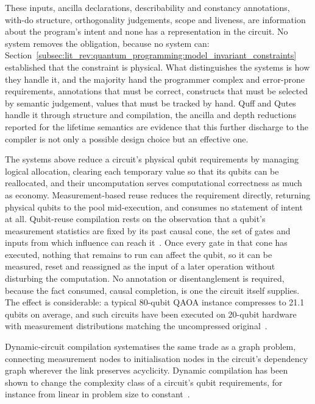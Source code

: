 These inputs, ancilla declarations, describability and constancy annotations, with-do structure, orthogonality judgements, scope and liveness, are information about the program's intent and none has a representation in the circuit.
No system removes the obligation, because no system can: Section~\ref{subsec:lit_rev:quantum_programming:model_invariant_constraints} established that the constraint is physical.
What distinguishes the systems is how they handle it, and the majority hand the programmer complex and error-prone requirements, annotations that must be correct, constructs that must be selected by semantic judgement, values that must be tracked by hand.
Quff and Qutes handle it through structure and compilation, the ancilla and depth reductions reported for the lifetime semantics are evidence that this further discharge to the compiler is not only a possible design choice but an effective one.

The systems above reduce a circuit's physical qubit requirements by managing logical allocation, clearing each temporary value so that its qubits can be reallocated, and their uncomputation serves computational correctness as much as economy.
Measurement-based reuse reduces the requirement directly, returning physical qubits to the pool mid-execution, and consumes no statement of intent at all.
Qubit-reuse compilation rests on the observation that a qubit's measurement statistics are fixed by its past causal cone, the set of gates and inputs from which influence can reach it~\cite{kissinger2022qubitreuse}.
Once every gate in that cone has executed, nothing that remains to run can affect the qubit, so it can be measured, reset and reassigned as the input of a later operation without disturbing the computation.
No annotation or disentanglement is required, because the fact consumed, causal completion, is one the circuit itself supplies.
The effect is considerable: a typical 80-qubit QAOA instance compresses to 21.1 qubits on average, and such circuits have been executed on 20-qubit hardware with measurement distributions matching the uncompressed original~\cite{kissinger2022qubitreuse}.

Dynamic-circuit compilation systematises the same trade as a graph problem, connecting measurement nodes to initialisation nodes in the circuit's dependency graph wherever the link preserves acyclicity.
Dynamic compilation has been shown to change the complexity class of a circuit's qubit requirements, for instance from linear in problem size to constant~\cite{zhang2023dynamic}.

